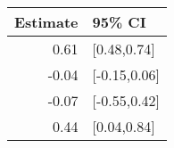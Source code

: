 \begin{tabular}{rl}
  \hline
Estimate & 95\% CI \\ 
  \hline
0.61 & [0.48,0.74] \\ 
  -0.04 & [-0.15,0.06] \\ 
  -0.07 & [-0.55,0.42] \\ 
  0.44 & [0.04,0.84] \\ 
   \hline
\end{tabular}

